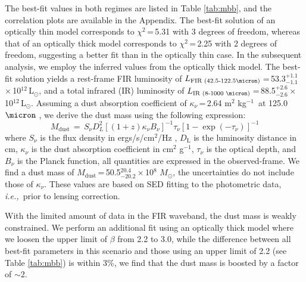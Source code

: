 \documentclass[twocolumn,apj,numberedappendix]{emulateapj}
\newcommand{\Msun}{\mbox{$M_{\odot}$}}
\newcommand{\Lsun}{\mbox{L$_{\odot}$}}
\newcommand{\ie}{{\sl i.e.,~}}
\newcommand{\pmOne}{\mbox{$^{-1}$}}
\begin{document}

The best-fit values in both regimes are listed in Table \ref{tab:mbb}, and the correlation plots are available in the Appendix. The best-fit solution of an optically thin
model corresponds to $\chi^2$\,=\,5.31 with 3 degrees of freedom, whereas that of an optically thick model
corresponds to $\chi^2$\,=\,2.25 with 2 degrees of freedom, suggesting a better fit than in the optically thin
case. In the subsequent analysis, we employ the inferred values from the optically thick model.
The best-fit solution yields a rest-frame FIR luminosity of $L_\textrm{FIR (42.5-122.5\micron)}$\,=\,53.3$^{+1.1}_{-1.1}$\,$\times$\,10$^{12}$\,\Lsun, and a total infrared (IR) luminosity of $L_\textrm{IR (8-1000 \micron)}$\,=\,88.5$^{+2.6}_{-2.6}$\,$\times$\,10$
^{12}$\,\Lsun. Assuming a dust absorption coefficient of $\kappa_{\nu}$\,=\,2.64 m$^2$ kg\pmOne\ at 125.0 $
\micron$ \citep{Dunne03a}, we derive the dust mass using the following expression:
\begin{equation}
M_\textrm{dust}\,=\,S_{\nu} D_{L}^2 [(1 + z) \kappa_{\nu} B_{\nu}]^{-1} \tau_{\nu} [1-
\exp(-\tau_{\nu})]^{-1}
\end{equation}
where $S_{\nu}$ is the flux density in ergs/s/cm$^{2}$/Hz , $D_\textrm{L}$ is the luminosity distance in cm, $\kappa_{\nu}$ is the dust
absorption coefficient in cm$^2$ g\pmOne, $\tau_{\nu}$ is the optical depth, and $B_{\nu}$ is the Planck function,
all quantities are expressed in the observed-frame. We find a dust mass of $M_\textrm{dust}$\,=\,50.5$^{20.4}_{-20.2}\times$10$^8$\,\,\Msun, the uncertainties do not include those of $\kappa_{\nu}$. These values are based on SED fitting to the photometric data, \ie prior
to lensing correction. 

With the limited amount of data in the FIR waveband, the dust mass is weakly constrained. 
We perform an additional fit using an optically thick model where we loosen the upper limit of $\beta$ from 2.2 to 3.0, while the difference between all best-fit parameters in this scenario and those using an upper limit of 2.2 (see Table \ref{tab:mbb}) is within 3\%, we find that the dust mass is boosted by a factor of $\sim$2. 
\end{document}
